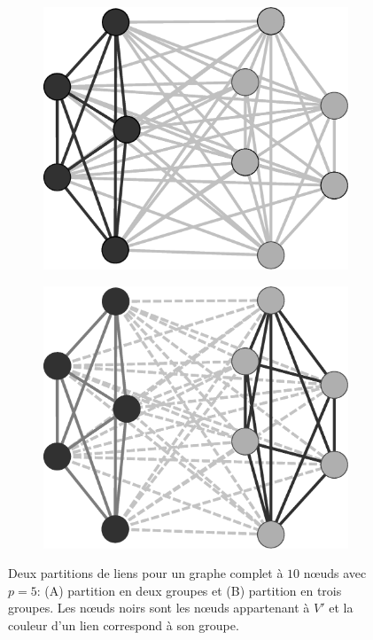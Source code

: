 \begin{figure}
\centering
	\begin{subfigure}{0.2\linewidth}
		\includegraphics[width=\linewidth]{img/ExpectedNodes/1Clique/Clique2}
		\caption{\label{fig:1C2}}	
	\end{subfigure}	\hspace{2cm}
	\begin{subfigure}{0.2\linewidth}
			\includegraphics[width=\linewidth]{img/ExpectedNodes/1Clique/Clique3}
			\caption{\label{fig:1C3}}		
	\end{subfigure}
	\caption{Deux partitions de liens pour un graphe complet à $10$ n\oe{}uds avec $p=5$: (A) partition en deux groupes et (B) partition en trois groupes.
	Les n\oe{}uds noirs sont les n\oe{}uds appartenant à $V'$ et la couleur d'un lien correspond à son groupe.}
	\label{fig:1C}
\end{figure}


